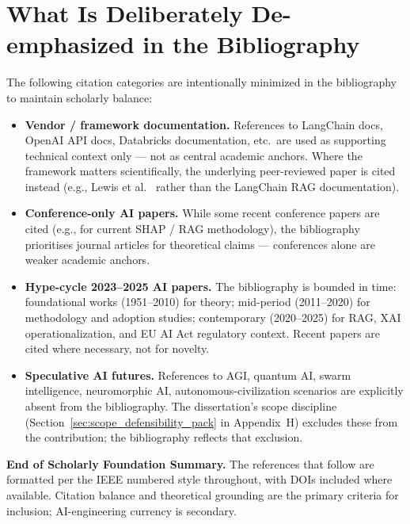 \documentclass[12pt,a4paper,oneside]{report}
\begin{document}
\section*{What Is Deliberately De-emphasized in the Bibliography}
\label{sec:scholarly_deemphasized}

\noindent The following citation categories are intentionally minimized in the bibliography to maintain scholarly balance:

\begin{itemize}[leftmargin=*, itemsep=2pt]
    \item \textbf{Vendor / framework documentation.} References to LangChain docs, OpenAI API docs, Databricks documentation, etc.\ are used as supporting technical context only --- not as central academic anchors. Where the framework matters scientifically, the underlying peer-reviewed paper is cited instead (e.g., Lewis et al.~\citep{lewis2020rag} rather than the LangChain RAG documentation).
    \item \textbf{Conference-only AI papers.} While some recent conference papers are cited (e.g., for current SHAP / RAG methodology), the bibliography prioritises journal articles for theoretical claims --- conferences alone are weaker academic anchors.
    \item \textbf{Hype-cycle 2023--2025 AI papers.} The bibliography is bounded in time: foundational works (1951--2010) for theory; mid-period (2011--2020) for methodology and adoption studies; contemporary (2020--2025) for RAG, XAI operationalization, and EU AI Act regulatory context. Recent papers are cited where necessary, not for novelty.
    \item \textbf{Speculative AI futures.} References to AGI, quantum AI, swarm intelligence, neuromorphic AI, autonomous-civilization scenarios are explicitly absent from the bibliography. The dissertation's scope discipline (Section~\ref{sec:scope_defensibility_pack} in Appendix~H) excludes these from the contribution; the bibliography reflects that exclusion.
\end{itemize}

\noindent\textbf{End of Scholarly Foundation Summary.} The references that follow are formatted per the IEEE numbered style throughout, with DOIs included where available. Citation balance and theoretical grounding are the primary criteria for inclusion; AI-engineering currency is secondary.

\clearpage

{}

\end{document}
